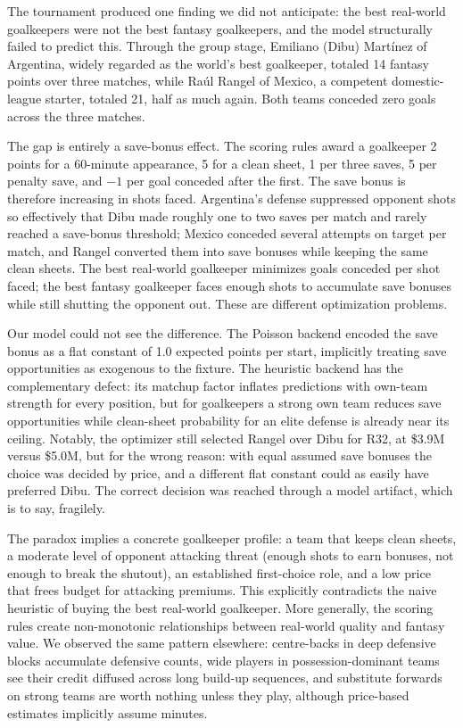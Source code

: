 The tournament produced one finding we did not anticipate: the best
real-world goalkeepers were not the best fantasy goalkeepers, and the
model structurally failed to predict this. Through the group stage,
Emiliano (Dibu) Mart\'inez of Argentina, widely regarded as the world's
best goalkeeper, totaled 14 fantasy points over three matches, while
Ra\'ul Rangel of Mexico, a competent domestic-league starter, totaled
21, half as much again. Both teams conceded zero goals across the three
matches.

The gap is entirely a save-bonus effect. The scoring rules award a
goalkeeper 2 points for a 60-minute appearance, 5 for a clean sheet,
1 per three saves, 5 per penalty save, and $-1$ per goal conceded after
the first. The save bonus is therefore increasing in shots faced.
Argentina's defense suppressed opponent shots so effectively that Dibu
made roughly one to two saves per match and rarely reached a save-bonus
threshold; Mexico conceded several attempts on target per match, and
Rangel converted them into save bonuses while keeping the same clean
sheets. The best real-world goalkeeper minimizes goals conceded per
shot faced; the best fantasy goalkeeper faces enough shots to
accumulate save bonuses while still shutting the opponent out. These
are different optimization problems.

Our model could not see the difference. The Poisson backend encoded the
save bonus as a flat constant of 1.0 expected points per start,
implicitly treating save opportunities as exogenous to the fixture. The
heuristic backend has the complementary defect: its matchup factor
inflates predictions with own-team strength for every position, but for
goalkeepers a strong own team reduces save opportunities while
clean-sheet probability for an elite defense is already near its
ceiling. Notably, the optimizer still selected Rangel over Dibu for
R32, at \$3.9M versus \$5.0M, but for the wrong reason: with equal
assumed save bonuses the choice was decided by price, and a different
flat constant could as easily have preferred Dibu. The correct decision
was reached through a model artifact, which is to say, fragilely.

The paradox implies a concrete goalkeeper profile: a team that keeps
clean sheets, a moderate level of opponent attacking threat (enough
shots to earn bonuses, not enough to break the shutout), an established
first-choice role, and a low price that frees budget for attacking
premiums. This explicitly contradicts the naive heuristic of buying the
best real-world goalkeeper. More generally, the scoring rules create
non-monotonic relationships between real-world quality and fantasy
value. We observed the same pattern elsewhere: centre-backs in deep
defensive blocks accumulate defensive counts, wide players in
possession-dominant teams see their credit diffused across long
build-up sequences, and substitute forwards on strong teams are worth
nothing unless they play, although price-based estimates implicitly
assume minutes.

